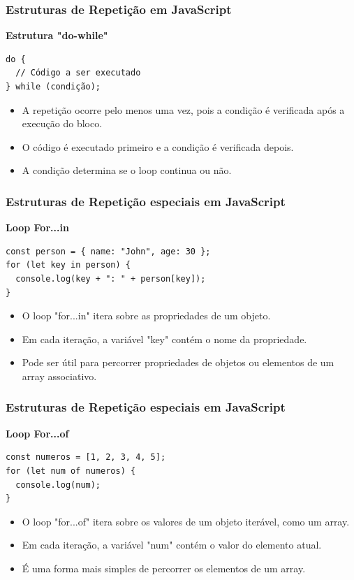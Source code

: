 \documentclass[13pt, xcolor={dvipsnames,svgnames}, portuguese]{beamer}
\begin{document}
\begin{frame}[fragile]
\frametitle{Estruturas de Repetição em JavaScript}

\textbf{Estrutura "do-while"}

\begin{verbatim}
do {
  // Código a ser executado
} while (condição);
\end{verbatim}

\begin{itemize}
  \item A repetição ocorre pelo menos uma vez, pois a condição é verificada após a execução do bloco.
  \item O código é executado primeiro e a condição é verificada depois.
  \item A condição determina se o loop continua ou não.
\end{itemize}

\end{frame}


\begin{frame}[fragile]
\frametitle{Estruturas de Repetição especiais em JavaScript}

\textbf{Loop For...in}

\begin{verbatim}
const person = { name: "John", age: 30 };
for (let key in person) {
  console.log(key + ": " + person[key]);
}
\end{verbatim}

\begin{itemize}
  \item O loop "for...in" itera sobre as propriedades de um objeto.
  \item Em cada iteração, a variável "key" contém o nome da propriedade.
  \item Pode ser útil para percorrer propriedades de objetos ou elementos de um array associativo.
\end{itemize}

\end{frame}

\begin{frame}[fragile]
\frametitle{Estruturas de Repetição especiais em JavaScript}

\textbf{Loop For...of}

\begin{verbatim}
const numeros = [1, 2, 3, 4, 5];
for (let num of numeros) {
  console.log(num);
}
\end{verbatim}

\begin{itemize}
  \item O loop "for...of" itera sobre os valores de um objeto iterável, como um array.
  \item Em cada iteração, a variável "num" contém o valor do elemento atual.
  \item É uma forma mais simples de percorrer os elementos de um array.
\end{itemize}

\end{frame}
\end{document}
